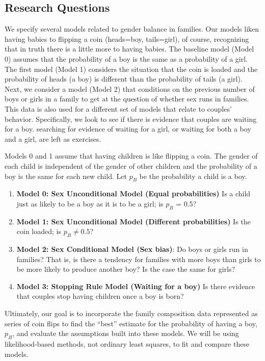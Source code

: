 \documentclass[
]{krantz}
\providecommand{\tightlist}{%
  \setlength{\itemsep}{0pt}\setlength{\parskip}{0pt}}
\begin{document}
\hypertarget{research-questions}{%
\subsection{Research Questions}\label{research-questions}}

We specify several models related to gender balance in families. Our models liken having babies to flipping a coin (heads=boy, tails=girl), of course, recognizing that in truth there is a little more to having babies. The baseline model (Model 0) assumes that the probability of a boy is the same as a probability of a girl. The first model (Model 1) considers the situation that the coin is loaded and the probability of heads (a boy) is different than the probability of tails (a girl). Next, we consider a model (Model 2) that conditions on the previous number of boys or girls in a family to get at the question of whether sex runs in families. This data is also used for a different set of models that relate to couples' behavior. Specifically, we look to see if there is evidence that couples are waiting for a boy. searching for evidence of waiting for a girl, or waiting for both a boy and a girl, are left as exercises.

Models 0 and 1 assume that having children is like flipping a coin. The gender of each child is independent of the gender of other children and the probability of a boy is the same for each new child. Let \(p_B\) be the probability a child is a boy.

\begin{enumerate}
\def\labelenumi{\arabic{enumi}.}
\tightlist
\item
  \textbf{Model 0: Sex Unconditional Model (Equal probabilities)} Is a child just as likely to be a boy as it is to be a girl; is \(p_B\) = 0.5?
\item
  \textbf{Model 1: Sex Unconditional Model (Different probabilities)} Is the coin loaded; is \(p_B \neq 0.5\)?
\item
  \textbf{Model 2: Sex Conditional Model (Sex bias)}: Do boys or girls run in families? That is,
  is there a tendency for families with more boys than girls to be more likely to produce another boy? Is the case the same for girls?
\item
  \textbf{Model 3: Stopping Rule Model (Waiting for a boy)}
  Is there evidence that couples stop having children once a boy is born?
\end{enumerate}

Ultimately, our goal is to incorporate the family composition data represented as series of coin flips to find the ``best'' estimate for the probability of having a boy, \(p_B\), and evaluate the assumptions built into these models. We will be using likelihood-based methods, not ordinary least squares, to fit and compare these models.
\end{document}

